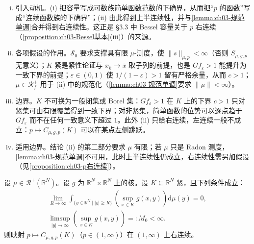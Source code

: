 \documentclass[../../main.tex]{subfiles}%
\begin{document}
\begin{remark}\label{remark:ch03-简单函数逼近}
\begin{enumerate}[(i)]
\item 引入动机。(i) 把容量写成可数族简单函数范数的下确界，从而把“$p$ 的函数”写成“连续函数族的下确界”；(ii) 由此得到上半连续性，并与\cref{lemma:ch03-规范单调}合并得到右连续性。这正是 \S3.3 中 Bessel 容量关于 $p$ 右连续（\cref{proposition:ch03-Bessel基本}(iii)）的来源。

\item 各项假设的作用。$\mathscr S_0$ 要求支撑具有限 $\mu$-测度，使 $\|s\|_{\mu,p}<\infty$（否则 $S_{\mu,g,p}$ 无意义）；$K$ 紧是紧性论证与 $x_k\to\bar x$ 取子列的前提，也是 $Gf_\varepsilon>1$ 能提升为一致下界的前提；$\varepsilon\in(0,1)$ 使 $1/(1-\varepsilon)>1$ 留有严格余量，从而 $c>1$；$\mu\in\mathscr{R}^+_f$ 用于 (ii) 中的规范化（\cref{lemma:ch03-规范单调}要求 $\|\mu\|<\infty$）。

\item 边界。$K$ 不可换为一般闭集或 Borel 集：$Gf_\varepsilon>1$ 在 $K$ 上的下界 $c>1$ 只对紧集可由有限覆盖得到一致下界；对非紧集，简单函数的位势可以逐点趋于 $Gf_\varepsilon$ 而不在任何一致意义下超过 $1$。此外 (ii) 只给右连续，左连续一般不成立：$p\mapsto C_{\mu,g,p}(K)$ 可以在某点左侧跳跃。

\item 适用边界。结论 (ii) 的第二部分要求 $\mu$ 有限；若 $\mu$ 只是 Radon 测度，\cref{lemma:ch03-规范单调}不可用，此时上半连续性仍成立，右连续性需另加假设（见\cref{proposition:ch03-p右连续}）。
\end{enumerate}
\end{remark}


\begin{proposition}\label{proposition:ch03-p右连续}
设 $\mu\in\mathscr{R}^+(\mathbb{R}^N)$。设 $g$ 为 $\mathbb{R}^N\times\mathbb{R}^N$ 上的核。设 $K\subseteq\mathbb{R}^N$ 紧，且下列条件成立：
\begin{align}
\lim_{R\to\infty}\int_{\{y\in\mathbb{R}^N\mid|y|\geqslant R\}}\left(\sup_{x\in K}g(x,y)\right)\mathrm{d}\mu(y)=0,\label{align:ch03-3.35a}\\
\limsup_{|y|\to\infty}\left(\sup_{x\in K}g(x,y)\right)=:M_0<\infty.\label{align:ch03-3.35b}
\end{align}
则映射 $p\mapsto C_{\mu,g,p}(K)$（$p\in(1,\infty)$）在 $(1,\infty)$ 上右连续。
\end{proposition}
\end{document}
